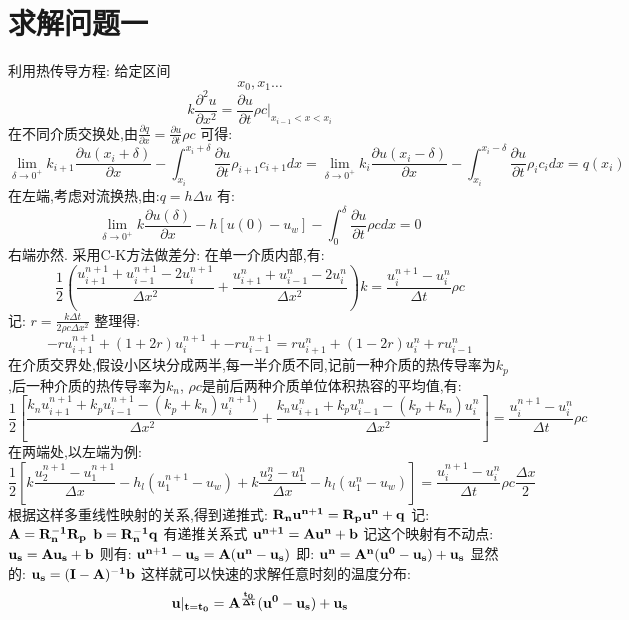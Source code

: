 \documentclass[utf8]{ctexart}
\begin{document}
    \section{求解问题一}

    利用热传导方程:
    给定区间\[x_0,x_1\dots\]
    \[k\frac{\partial^2 u}{\partial x^2} = \frac{\partial u}{\partial t}\rho c |_{x_{i-1}<x<x_{i}}\]
    在不同介质交换处,由\(\frac{\partial{q}}{\partial{x}} = \frac{\partial{u}}{\partial{t}} \rho c \)
    可得:
    \[ 
        \lim_{\delta \to 0^+} 
        k_{i+1 }\frac{\partial{u(x_i+\delta)}}{\partial{x}} 
        -
        \int_{x_i}^{x_i+\delta}\frac{\partial{u}}{\partial{t}} \rho_{i+1} c_{i+1} dx 
        = 
        \lim_{\delta \to 0^+} 
        k_{i} \frac{\partial{u(x_i-\delta)}}{\partial{x}}
        - 
        \int_{x_i}^{x_i-\delta}\frac{\partial{u}}{\partial{t}} \rho_i c_i dx
        =
        q(x_i)
    \]
    在左端,考虑对流换热,由:\(q = h\Delta u\)
    有:
    \[
        \lim_{\delta \to 0^+} 
        k\frac{\partial{u(\delta)}}{\partial{x}} 
        - 
        h[u(0) - u_w]
        -
        \int_{0}^{\delta}\frac{\partial{u}}{\partial{t}} \rho c dx 
        = 0
    \]
    右端亦然.
    采用C-K方法做差分:
    在单一介质内部,有:
    \[
        \frac{1}{2}
        \left(
            \frac{u_{i+1}^{n+1} + u_{i-1}^{n+1} - 2u_{i}^{n+1} }{\Delta x^2}
            +
            \frac{u_{i+1}^{n} + u_{i-1}^{n} - 2u_{i}^{n} }{\Delta x^2}
        \right)
        k
        =
        \frac{ u_{i}^{n+1} - u_{i}^{n} }{\Delta t} \rho c
    \]
    记:
    \( r = \frac{k \Delta t}{ 2 \rho c \Delta x^2 } \)
    整理得:
    \[
        -ru_{i+1}^{n+1} + (1+2r)u_{i}^{n+1} + -ru_{i-1}^{n+1}
        =
        ru_{i+1}^{n} + (1-2r)u_{i}^{n} + ru_{i-1}^{n}
    \]
    在介质交界处,假设小区块分成两半,每一半介质不同,记前一种介质的热传导率为\(k_p\),后一种介质的热传导率为\(k_n\),
    \(\rho c\)是前后两种介质单位体积热容的平均值,有:
    \[
        \frac{1}{2}
        \left[
            \frac{k_n u_{i+1}^{n+1} + k_p u_{i-1}^{n+1} - (k_p+k_n)u_{i}^{n+1}) }{\Delta x^2}
            +
            \frac{k_n u_{i+1}^{n} + k_p u_{i-1}^{n} - (k_p+k_n)u_{i}^{n} }{\Delta x^2}
        \right]
        =
        \frac{ u_{i}^{n+1} - u_{i}^{n} }{\Delta t} \rho c
    \]
    在两端处,以左端为例:
    \[
        \frac{1}{2}
        \left[
            k\frac{ u_{2}^{n+1}  - u_{1}^{n+1} }{\Delta x}
            -
            h_l(u_{1}^{n+1} - u_w)
            +
            k\frac{ u_{2}^{n}  - u_{1}^{n} }{\Delta x}
            -
            h_l(u_{1}^{n} - u_w)
        \right]
        =
        \frac{ u_{i}^{n+1} - u_{i}^{n} }{\Delta t} \rho c \frac{\Delta x}{2}
    \]
    根据这样多重线性映射的关系,得到递推式:
    \(\bf{R_n}\bf{u}^{n+1} = \bf{R_p}\bf{u}^{n} + \bf{q}\)
    记:
    \(\bf{A} = \bf{R}_n^{-1}\bf{R}_p\)
    \(\bf{b} = \bf{R}_n^{-1}\bf{q}\)
    有递推关系式
    \(\bf{u}^{n+1} = \bf{A}\bf{u}^{n} + \bf{b}\)
    记这个映射有不动点:
    \(\bf{u}_s = \bf{A}\bf{u}_s + \bf{b}\)
    则有:
    \(  \bf{u}^{n+1} - \bf{u}_s = \bf{A} (\bf{u}^n - \bf{u}_s) \)
    即:
    \(  \bf{u}^{n} = \bf{A}^n (\bf{u}^0 - \bf{u}_s) + \bf{u}_s\)
    显然的:
    \(\bf{u}_s = (\bf{I} - \bf{A})^{-1}\bf{b}\)
    这样就可以快速的求解任意时刻的温度分布:
    \[  \bf{u}|_{t = t_0} = \bf{A}^{\frac{t_0}{\Delta t}} (\bf{u}^0 - \bf{u}_s) + \bf{u}_s\]
\end{document}
